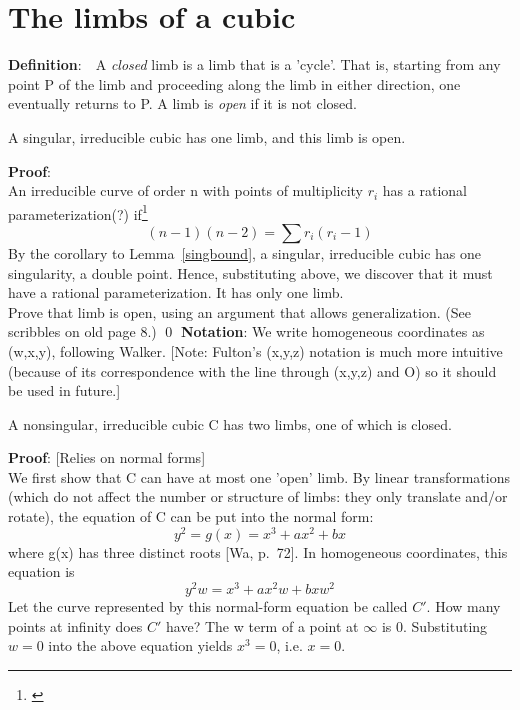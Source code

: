 \section{The limbs of a cubic}
{\bf Definition}:\ \ A {\em closed} limb is a limb that is a 'cycle'.
That is, starting from any point P of the limb and proceeding along the
limb in either direction, one eventually returns to P.  
A limb is {\em open} if it is not closed.
\begin{lemma}\nopagebreak
A singular, irreducible cubic has one limb, and this limb is open.
\end{lemma}
{\bf Proof}:\nopagebreak \\
An irreducible curve of order n with points of multiplicity $r_{i}$
has a rational 
parameterization(?) if\footnote{\cite[p.\ 67]{wa}}
\[ (n-1)(n-2) = \sum r_{i}(r_{i} - 1) \]
By the corollary to Lemma~\ref{singbound},
a singular, irreducible cubic has one
singularity, a double point.  Hence, substituting above, we discover
that it must have a rational parameterization.
\hence It has only 
one limb.\\
Prove that limb is open, using an argument that allows generalization.
(See scribbles on old page 8.)
\qed
{\bf Notation}:  We write homogeneous coordinates as (w,x,y), following
Walker. [Note: Fulton's (x,y,z) notation is much more intuitive
 (because of its
correspondence with the line through (x,y,z) and O) so it should be used
in future.]
\begin{lemma}\nopagebreak
A nonsingular, irreducible cubic C has two limbs, one of which is closed.
\end{lemma}
{\bf Proof}: [Relies on normal forms]\nopagebreak \\
We first show that C can have at most one 'open' limb.
By linear transformations (which do not affect the number or structure
of limbs: they only translate and/or rotate), the equation of C
can be put into the
normal form:
\[ y^{2} = g(x) = x^{3} + ax^{2} + bx \]
where g(x) has three distinct roots [Wa, p.\ 72].
In homogeneous coordinates, this equation is
\[ y^{2}w = x^{3} + ax^{2}w + bxw^{2} \]
Let the curve represented by this normal-form equation be called $C'$.
How many points at infinity does $C'$ have?
The w term of a point at $\infty$ is 0.  Substituting $w=0$
into the above equation yields $x^{3} = 0$, i.e. $x=0$.
